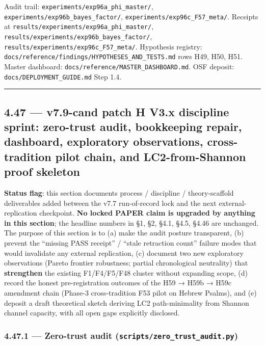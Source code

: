 \documentclass[
]{article}
\begin{document}
Audit trail: \texttt{experiments/exp96a\_phi\_master/},
\texttt{experiments/exp96b\_bayes\_factor/},
\texttt{experiments/exp96c\_F57\_meta/}. Receipts at
\texttt{results/experiments/exp96a\_phi\_master/},
\texttt{results/experiments/exp96b\_bayes\_factor/},
\texttt{results/experiments/exp96c\_F57\_meta/}. Hypothesis registry:
\texttt{docs/reference/findings/HYPOTHESES\_AND\_TESTS.md} rows H49,
H50, H51. Master dashboard:
\texttt{docs/reference/MASTER\_DASHBOARD.md}. OSF deposit:
\texttt{docs/DEPLOYMENT\_GUIDE.md} Step 1.4.

\begin{center}\rule{0.5\linewidth}{0.5pt}\end{center}

\subsection{4.47 --- v7.9-cand patch H V3.x discipline sprint:
zero-trust audit, bookkeeping repair, dashboard, exploratory
observations, cross-tradition pilot chain, and LC2-from-Shannon proof
skeleton}\label{v7.9-cand-patch-h-v3.x-discipline-sprint-zero-trust-audit-bookkeeping-repair-dashboard-exploratory-observations-cross-tradition-pilot-chain-and-lc2-from-shannon-proof-skeleton}

\textbf{Status flag}: this section documents process / discipline /
theory-scaffold deliverables added between the v7.7 run-of-record lock
and the next external-replication checkpoint. \textbf{No locked PAPER
claim is upgraded by anything in this section}; the headline numbers in
§1, §2, §4.1, §4.5, §4.46 are unchanged. The purpose of this section is
to (a) make the audit posture transparent, (b) prevent the ``missing
PASS receipt'' / ``stale retraction count'' failure modes that would
invalidate any external replication, (c) document two new exploratory
observations (Pareto frontier robustness; partial chronological
neutrality) that \textbf{strengthen} the existing F1/F4/F5/F48 cluster
without expanding scope, (d) record the honest pre-registration outcomes
of the H59 → H59b → H59c amendment chain (Phase-3 cross-tradition F53
pilot on Hebrew Psalms), and (e) deposit a draft theoretical sketch
deriving LC2 path-minimality from Shannon channel capacity, with all
open gaps explicitly disclosed.

\subsubsection{\texorpdfstring{4.47.1 --- Zero-trust audit
(\texttt{scripts/zero\_trust\_audit.py})}{4.47.1 --- Zero-trust audit (scripts/zero\_trust\_audit.py)}}\label{zero-trust-audit-scriptszero_trust_audit.py}
\end{document}
